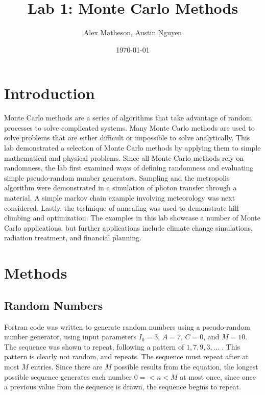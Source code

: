 \documentclass[twocolumn]{article}
\begin{document}
\title{Lab 1: Monte Carlo Methods}
\author{Alex Matheson, Austin Nguyen}
\date{\today}
\maketitle

\section{Introduction}
Monte Carlo methods are a series of algorithms that take advantage of random processes to solve complicated systems. Many Monte Carlo methods are used to solve problems that are either difficult or impossible to solve analytically. This lab demonstrated a selection of Monte Carlo methods by applying them to simple mathematical and physical problems. Since all Monte Carlo methods rely on randomness, the lab first examined ways of defining randomness and evaluating simple pseudo-random number generators. Sampling and the metropolis algorithm were demonstrated in a simulation of photon transfer through a material. A simple markov chain example involving meteorology was next considered. Lastly, the technique of annealing was used to demonstrate hill climbing and optimization. The examples in this lab showcase a number of Monte Carlo applications, but further applications include climate change simulations, radiation treatment, and financial planning.

\section{Methods}
\subsection{Random Numbers}
Fortran code was written to generate random numbers using a pseudo-random number generator, using input parameters $I_0=3$, $A=7$, $C=0$, and $M=10$. The sequence was shown to repeat, following a pattern of $1,7,9,3,...$ . This pattern is clearly not random, and repeats. The sequence must repeat after at most $M$ entries. Since there are $M$ possible results from the equation, the longest possible sequence generates each number $0=<n<M$ at most once, since once a previous value from the sequence is drawn, the sequence begins to repeat. 
\end{document}
